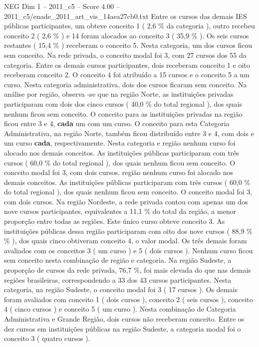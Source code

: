 \begin{textsample}{NEG Dim 1 – 2011\_c5 – Score 4.00 – 2011\_c5/enade\_2011\_art\_vis\_14aea27cb0.txt}
Entre os cursos das demais IES públicas participantes, um obteve conceito 1 ( 2,6 \% da categoria ), outro recebeu conceito 2 ( 2,6 \% ) e 14 foram alocados ao conceito 3 ( 35,9 \% ).
Os seis cursos restantes ( 15,4 \% ) receberam o conceito 5.
Nesta categoria, um dos cursos ficou sem conceito.
Na rede privada, o conceito modal foi 3, com 27 cursos dos 55 da categoria.
Entre os demais cursos participantes, dois receberam conceito 1 e oito receberam conceito 2.
O conceito 4 foi atribuído a 15 cursos e o conceito 5 a um curso.
Nesta categoria administrativa, dois dos cursos ficaram sem conceito.
Na análise por região, observa -se que na região Norte, as instituições privadas participaram com dois dos cinco cursos ( 40,0 \% do total regional ), dos quais nenhum ficou sem conceito.
O conceito para as instituições privadas na região ficou entre 3 e 4, \textbf{cada} um com um curso.
O conceito para esta Categoria Administrativa, na região Norte, também ficou distribuído entre 3 e 4, com dois e um curso \textbf{cada}, respectivamente.
Nesta categoria e região nenhum curso foi alocado nos demais conceitos.
As instituições públicas participaram com três cursos ( 60,0 \% do total regional ), dos quais nenhum ficou sem conceito.
O conceito modal foi 3, com dois cursos. região nenhum curso foi alocado nos demais conceitos.
As instituições públicas participaram com três cursos ( 60,0 \% do total regional ), dos quais nenhum ficou sem conceito.
O conceito modal foi 3, com dois cursos.
Na região Nordeste, a rede privada contou com apenas um dos nove cursos participantes, equivalentes a 11,1 \% do total da região, a menor proporção entre todas as regiões.
Este único curso obteve conceito 3.
As instituições públicas dessa região participaram com oito dos nove cursos ( 88,9 \% \% ), dos quais cinco obtiveram conceito 4, o valor modal.
Os três demais foram avaliados com os conceitos 3 ( um curso ) e 5 ( dois cursos ).
Nenhum curso ficou sem conceito nesta combinação de região e categoria.
Na região Sudeste, a proporção de cursos da rede privada, 76,7 \%, foi mais elevada do que nas demais regiões brasileiras, correspondendo a 33 dos 43 cursos participantes.
Nesta categoria, na região Sudeste, o conceito modal foi 3 ( 17 cursos ).
Os demais foram avaliados com conceito 1 ( dois cursos ), conceito 2 ( seis cursos ), conceito 4 ( cinco cursos ) e conceito 5 ( um curso ).
Nesta combinação de Categoria Administrativa e Grande Região, dois cursos não receberam conceito.
Entre os dez cursos em instituições públicas na região Sudeste, a categoria modal foi o conceito 3 ( quatro cursos ).

\end{textsample}

